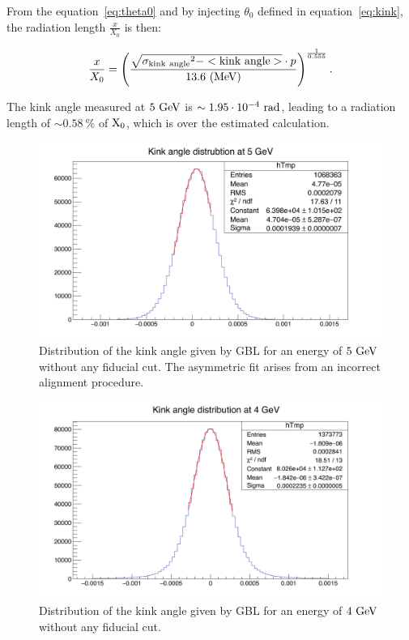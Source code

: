    From the equation~\ref{eq:theta0} and by injecting $\theta_0$ defined in equation~\ref{eq:kink}, the radiation length $\frac{x}{X_0}$ is then:
   
   \begin{equation}
     \frac{x}{X_{0}} = \left( \frac{\sqrt{\rm{\sigma_{kink~angle}}^2 - <\rm{kink~angle}>} \cdot p}{13.6~\rm{(MeV)}} \right)^{\frac{1}{0.555}}.
   \end{equation}

   The kink angle measured at $5~\rm{GeV}$ is $\sim 1.95 \cdot 10^{-4}~\rm{rad}$, leading to a radiation length of $\sim 0.58~\%$ of $\rm{X_0}$, which is over the estimated calculation.
   
   \begin{figure}[!h]
     \centering
     \includegraphics[width = \textwidth]{Pictures/X0/kinkAngle5GeV_2.png}
     \caption{Distribution of the kink angle given by GBL for an energy of $5~\rm{GeV}$ without any fiducial cut. The asymmetric fit arises from an incorrect alignment procedure.}
     \label{fig:kinkAngle5GeV}
   \end{figure} 

   \begin{figure}[!p]
     \centering
     \includegraphics[width = \textwidth]{Pictures/X0/kinkAngle4GeV.png}
     \caption{Distribution of the kink angle given by GBL for an energy of $4~\rm{GeV}$ without any fiducial cut.}
     \label{fig:kinkAngle4GeV}
   \end{figure} 


